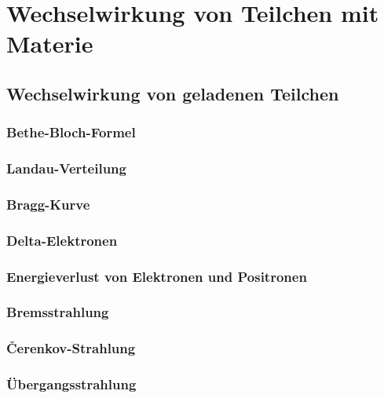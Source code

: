 \documentclass{article}
\begin{document}



\section{Wechselwirkung von Teilchen mit Materie}
\graphicspath{{bilder/1-1/}}
	\subsection{Wechselwirkung von geladenen Teilchen}
		
			\subsubsection{Bethe-Bloch-Formel}
				
			\subsubsection{Landau-Verteilung}
				
			\subsubsection{Bragg-Kurve}
				
			\subsubsection{Delta-Elektronen}
				
			\subsubsection{Energieverlust von Elektronen und Positronen}
				
			\subsubsection{Bremsstrahlung}
				
			\subsubsection{\v{C}erenkov-Strahlung}
				
			\subsubsection{Übergangsstrahlung}
				
\end{document}
